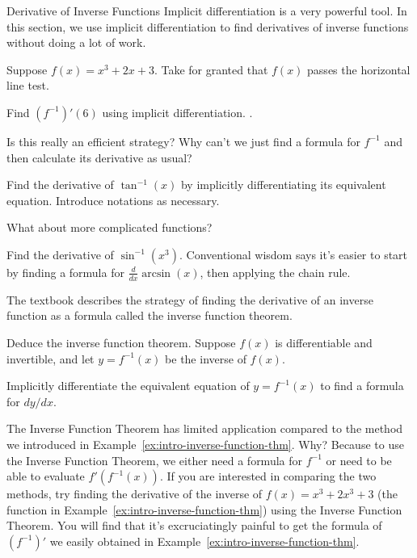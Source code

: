 \documentclass[../main.tex]{subfiles}
\begin{document}
\begin{lesson}{Derivative of Inverse Functions}
  Implicit differentiation is a very powerful tool. In this section, we use implicit differentiation to find derivatives of inverse functions without doing a lot of work. 

  \begin{example} \label{ex:intro-inverse-function-thm}
    Suppose \(f(x) = x^{3} + 2x + 3\). Take for granted that \(f(x)\) passes the horizontal line test.

    Find \((f^{-1})'(6)\) using implicit differentiation.
    .
  \end{example}
  \faComment{} Is this really an efficient strategy? Why can't we just find a formula for \(f^{-1}\) and then calculate its derivative as usual?
  \clearpage

  \begin{example} \label{ex:derivative-of-arctan}
    Find the derivative of \(\tan^{-1}(x)\) by implicitly differentiating its equivalent equation.  
    Introduce notations as necessary.

  \end{example}
  
  What about more complicated functions? 
  \begin{example} \label{ex:derivative-of-arcsin}
    Find the derivative of \(\sin^{-1}(x^{3})\).  Conventional wisdom says it's easier to start by finding a formula for \(\frac{d}{dx} \arcsin(x)\), then applying the chain rule.

  \end{example}
  \clearpage

  The textbook describes the strategy of finding the derivative of an inverse function as a formula called the inverse function theorem. 
  \begin{example}
    Deduce the inverse function theorem.  Suppose \(f(x)\) is differentiable and invertible, and let \(y = f^{-1}(x)\) be the inverse of \(f(x)\).

    Implicitly differentiate the equivalent equation of \(y = f^{-1}(x)\) to find a formula for \(dy/dx\).

  \end{example}

  \faExclamationTriangle{} The Inverse Function Theorem has limited application compared to the method we introduced in Example~\ref{ex:intro-inverse-function-thm}. Why? Because to use the Inverse Function Theorem, we either need a formula for \(f^{-1}\) or need to be able to evaluate \(f'(f^{-1}(x))\). If you are interested in comparing the two methods, try finding the derivative of the inverse of \(f(x) = x^{3} + 2x^{3} + 3\) (the function in Example~\ref{ex:intro-inverse-function-thm}) using the Inverse Function Theorem. You will find that it's excruciatingly painful to get the formula of \((f^{-1})'\) we easily obtained in Example~\ref{ex:intro-inverse-function-thm}.

  
\end{lesson}
\end{document}
